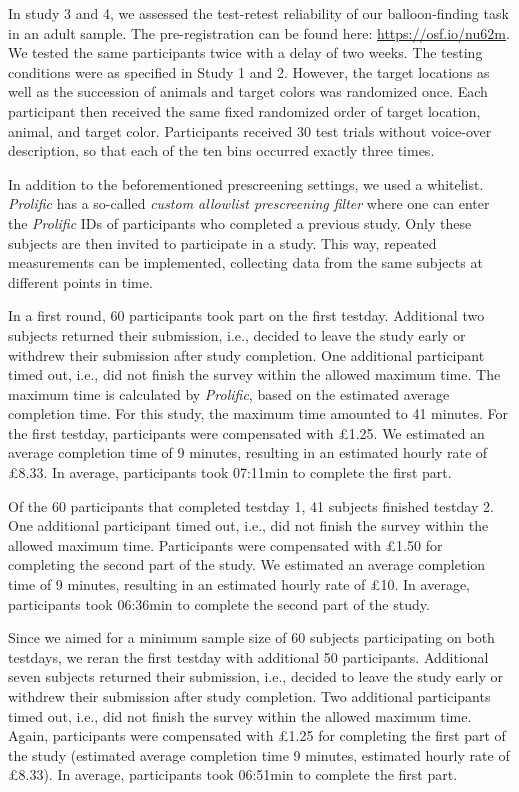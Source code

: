 \documentclass[
  english,
  man,floatsintext]{apa6}
\begin{document}
In study 3 and 4, we assessed the test-retest reliability of our balloon-finding task in an adult sample. The pre-registration can be found here: \url{https://osf.io/nu62m}. We tested the same participants twice with a delay of two weeks. The testing conditions were as specified in Study 1 and 2. However, the target locations as well as the succession of animals and target colors was randomized once. Each participant then received the same fixed randomized order of target location, animal, and target color. Participants received 30 test trials without voice-over description, so that each of the ten bins occurred exactly three times.

In addition to the beforementioned prescreening settings, we used a whitelist. \emph{Prolific} has a so-called \emph{custom allowlist prescreening filter} where one can enter the \emph{Prolific} IDs of participants who completed a previous study. Only these subjects are then invited to participate in a study. This way, repeated measurements can be implemented, collecting data from the same subjects at different points in time.

In a first round, 60 participants took part on the first testday. Additional two subjects returned their submission, i.e., decided to leave the study early or withdrew their submission after study completion. One additional participant timed out, i.e., did not finish the survey within the allowed maximum time. The maximum time is calculated by \emph{Prolific}, based on the estimated average completion time. For this study, the maximum time amounted to 41 minutes. For the first testday, participants were compensated with £1.25. We estimated an average completion time of 9 minutes, resulting in an estimated hourly rate of £8.33. In average, participants took 07:11min to complete the first part.

Of the 60 participants that completed testday 1, 41 subjects finished testday 2. One additional participant timed out, i.e., did not finish the survey within the allowed maximum time. Participants were compensated with £1.50 for completing the second part of the study. We estimated an average completion time of 9 minutes, resulting in an estimated hourly rate of £10. In average, participants took 06:36min to complete the second part of the study.

Since we aimed for a minimum sample size of 60 subjects participating on both testdays, we reran the first testday with additional 50 participants. Additional seven subjects returned their submission, i.e., decided to leave the study early or withdrew their submission after study completion. Two additional participants timed out, i.e., did not finish the survey within the allowed maximum time. Again, participants were compensated with £1.25 for completing the first part of the study (estimated average completion time 9 minutes, estimated hourly rate of £8.33). In average, participants took 06:51min to complete the first part.
\end{document}
